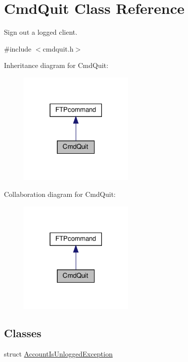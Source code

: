 \hypertarget{classCmdQuit}{}\section{Cmd\+Quit Class Reference}
\label{classCmdQuit}


Sign out a logged client.  




{\ttfamily \#include $<$cmdquit.\+h$>$}



Inheritance diagram for Cmd\+Quit\+:
\nopagebreak
\begin{figure}[H]
\begin{center}
\leavevmode
\includegraphics[width=158pt]{classCmdQuit__inherit__graph}
\end{center}
\end{figure}


Collaboration diagram for Cmd\+Quit\+:
\nopagebreak
\begin{figure}[H]
\begin{center}
\leavevmode
\includegraphics[width=158pt]{classCmdQuit__coll__graph}
\end{center}
\end{figure}
\subsection*{Classes}
\begin{DoxyCompactItemize}
\item 
struct \hyperlink{structCmdQuit_1_1AccountIsUnloggedException}{Account\+Is\+Unlogged\+Exception}
\end{DoxyCompactItemize}
